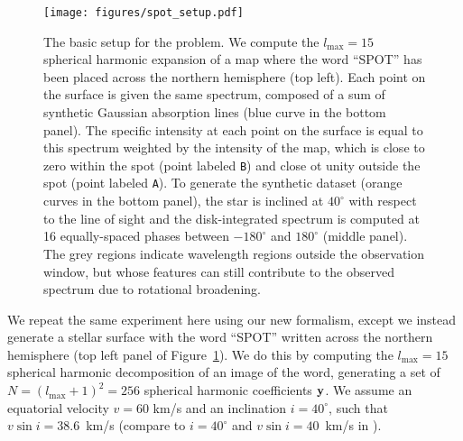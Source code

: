 \documentclass[modern]{aastex631}
\begin{document}
\begin{figure}[t!]
    \begin{centering}
        \texttt{[image: figures/spot\_setup.pdf]}
        \caption{%
            The basic setup for the \spot problem. 
            We compute the $l_\mathrm{max} = 15$ spherical harmonic expansion of a map where the word ``SPOT'' has been placed across the northern hemisphere (top left). 
            Each point on the surface is given the same spectrum, composed of a sum of synthetic Gaussian absorption lines (blue curve in the bottom panel).
            The specific intensity at each point on the surface is equal to this spectrum weighted by the intensity of the map, which is close to zero within the spot (point labeled \texttt{B}) and close ot unity outside the spot (point labeled \texttt{A}).
            To generate the synthetic dataset (orange curves in the bottom panel), the star is inclined at $40^\circ$ with respect to the line of sight and the disk-integrated spectrum is computed at 16 equally-spaced phases between $-180^\circ$ and $180^\circ$ (middle panel).
            The grey regions indicate wavelength regions outside the observation window, but whose features can still contribute to the observed spectrum due to rotational broadening.
        }
        \label{fig:spot_setup}
    \end{centering}
\end{figure}

We repeat the same experiment here using our new formalism, except we instead generate a stellar surface with the word ``SPOT'' written across the northern hemisphere (top left panel of Figure~\ref{fig:spot_setup}).
We do this by computing the $l_\mathrm{max} = 15$ spherical harmonic decomposition of an image of the word, generating a set of $N = (l_\mathrm{max} + 1)^2 = 256$ spherical harmonic coefficients ${\mathbf{y}}$. 
We assume an equatorial velocity $v = 60$ km/s and an inclination $i = 40^\circ$, such that $v \sin i = 38.6$~km/s (compare to $i = 40^\circ$ and $v \sin i = 40$~km/s in \citealt{Vogt1987}).
\end{document}
